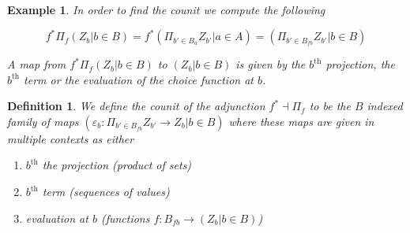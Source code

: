 \documentclass{article}
\theoremstyle{problemstyle}
\theoremstyle{problemstyle}
\newtheorem{definition}{Definition}
\theoremstyle{problemstyle}
\newtheorem{example}{Example}
\theoremstyle{problemstyle}
\theoremstyle{problemstyle}
\theoremstyle{problemstyle}
\theoremstyle{problemstyle}
\theoremstyle{problemstyle}
\begin{document}
\begin{example}
In order to find the counit we compute the following

$$f^*\Pi_f(Z_b |b \in B) = f^*(\Pi_{b'\in B_a}Z_{b'}|a \in A) = (\Pi_{b' \in B_{fb}}Z_{b'}|b \in B)$$

A map from $f^*\Pi_f(Z_b |b \in B)$ to $(Z_b |b \in B)$ is given by the $b^{\text{th}}$ projection, the $b^{\text{th}}$ term or the evaluation of the choice function at $b$. 
\end{example}

\begin{definition}
We define the counit of the adjunction $f^* \dashv \Pi_f$ to be the $B$ indexed family of maps $(\varepsilon_b:\Pi_{b' \in B_{fb}}Z_{b'}\rightarrow Z_b|b \in B)$ where these maps are given in multiple contexts as either 
\begin{enumerate}
\item $b^{\text{th}}$ the projection (product of sets)
\item $b^{\text{th}}$ term (sequences of values)
\item evaluation at $b$ (functions $f:B_{fb}\rightarrow (Z_b|b \in B)$)
\end{enumerate}
\end{definition}
\end{document}
